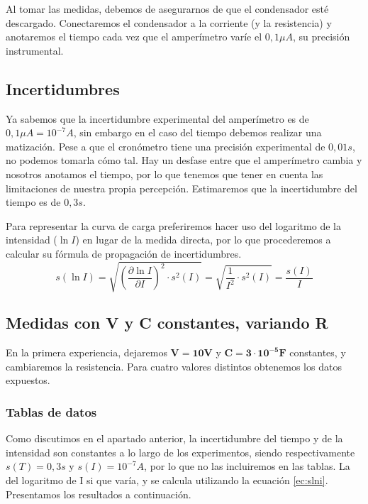 \documentclass[12pt, a4paper, titlepage]{article}
\begin{document}
  Al tomar las medidas, debemos de asegurarnos de que el condensador esté descargado. Conectaremos el condensador a la corriente (y la resistencia) y anotaremos el tiempo cada vez que el amperímetro varíe el $0,1 \mu A$, su precisión instrumental.

  \subsection{Incertidumbres}

  Ya sabemos que la incertidumbre experimental del amperímetro es de $0,1 \mu A = 10^{-7} A$, sin embargo en el caso del tiempo debemos realizar una matización. Pese a que el cronómetro tiene una precisión experimental de $0,01 s$, no podemos tomarla cómo tal. Hay un desfase entre que el amperímetro cambia y nosotros anotamos el tiempo, por lo que tenemos que tener en cuenta las limitaciones de nuestra propia percepción. Estimaremos que la incertidumbre del tiempo es de $0,3 s$.

  Para representar la curva de carga preferiremos hacer uso del logaritmo de la intensidad ($\ln{I}$) en lugar de la medida directa, por lo que procederemos a calcular su fórmula de propagación de incertidumbres.
  \begin{equation}
    s(\ln{I}) = \sqrt{\left( \frac{\partial \ln{I}}{\partial I} \right)^2 \cdot s^2(I)} = \sqrt{\frac{1}{I^2} \cdot s^2(I)} = \frac{s(I)}{I} \label{ec:slni}
  \end{equation}

  \newpage
  \subsection{Medidas con \textbf{V} y \textbf{C} constantes, variando \textbf{R}}

  En la primera experiencia, dejaremos $\mathbf{V = 10V}$ y $\mathbf{C = 3 \cdot 10^{-5} F}$ constantes, y cambiaremos la resistencia. Para cuatro valores distintos obtenemos los datos expuestos.

  \subsubsection{Tablas de datos}

  Como discutimos en el apartado anterior, la incertidumbre del tiempo y de la intensidad son constantes a lo largo de los experimentos, siendo respectivamente $s(T) = 0,3 s$ y $s(I) = 10^{-7} A$, por lo que no las incluiremos en las tablas. La del logaritmo de I si que varía, y se calcula utilizando la ecuación \ref{ec:slni}. Presentamos los resultados a continuación.
\end{document}
